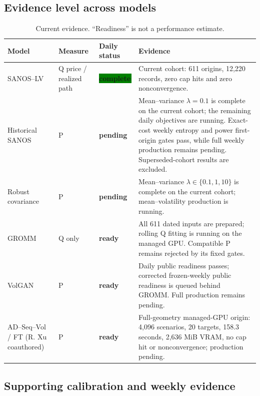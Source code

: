 \documentclass[10pt]{article}
\newcommand{\statuscomplete}{\colorbox{green}{\strut\textbf{complete}}}
\newcommand{\statusready}{\colorbox{pale}{\strut\textbf{ready}}}
\newcommand{\statuspending}{\colorbox{amber}{\strut\textbf{pending}}}
\begin{document}
\subsection{Evidence level across models}

\begin{table}[H]
\centering
\small
\caption{Current evidence. ``Readiness'' is not a performance estimate.}
\begin{tabularx}{\textwidth}{>{\raggedright\arraybackslash}p{28mm}p{19mm}p{25mm}X}
\toprule
Model & Measure & Daily status & Evidence \\
\midrule
SANOS--LV & Q price / realized path & \statuscomplete & Current cohort: 611 origins, 12,220 records, zero cap hits and zero nonconvergence. \\
Historical SANOS & P & \statuspending & Mean--variance $\lambda=0.1$ is complete on the current cohort; the remaining daily objectives are running. Exact-cost weekly entropy and power first-origin gates pass, while full weekly production remains pending. Superseded-cohort results are excluded. \\
Robust covariance & P & \statuspending & Mean--variance $\lambda\in\{0.1,1,10\}$ is complete on the current cohort; mean--volatility production is running. \\
GROMM & Q only & \statusready & All 611 dated inputs are prepared; rolling Q fitting is running on the managed GPU. Compatible P remains rejected by its fixed gates. \\
VolGAN & P & \statusready & Daily public readiness passes; corrected frozen-weekly public readiness is queued behind GROMM. Full production remains pending. \\
AD--Seq--Vol / FT (R. Xu coauthored) & P & \statusready & Full-geometry managed-GPU origin: 4,096 scenarios, 20 targets, 158.3 seconds, 2,636 MiB VRAM, no cap hit or nonconvergence; production pending. \\
\bottomrule
\end{tabularx}
\end{table}

\subsection{Supporting calibration and weekly evidence}
\end{document}
